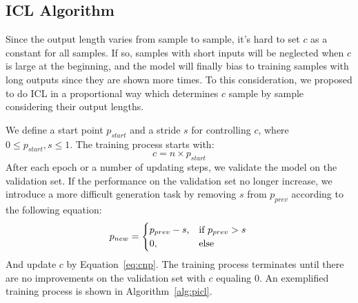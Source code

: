  
\subsection{ICL Algorithm}
Since the output length varies from sample to sample, it's hard to set $c$ as a constant for all samples.
If so, samples with short inputs will be neglected when $c$ is large at the beginning, and the model will finally bias to training samples with long outputs since they are shown more times.
To this consideration, we proposed to do ICL in a proportional way which determines $c$ sample by sample considering their output lengths.

We define a start point $p_{start}$ and a stride $s$ for controlling $c$, where $0\leq p_{start}, s \leq 1$.
The training process starts with: 
\begin{equation}
	c = n\times p_{start}
	\label{eq:cnp}
\end{equation}
After each epoch or a number of updating steps, we validate the model on the validation set. If the performance on the validation set no longer increase, we introduce a more difficult generation task by removing $s$ from $p_{prev}$ according to the following equation:
\begin{equation*}
	p_{new} = 
	\begin{cases}
	p_{prev}-s, & \text{if $p_{prev}>s$} \\
	0, & \text{else}
	\end{cases} \\
\end{equation*}
And update $c$ by Equation~\ref{eq:cnp}. The training process terminates until there are no improvements on the validation set with $c$ equaling 0.
An exemplified training process is shown in Algorithm~\ref{alg:picl}. %

